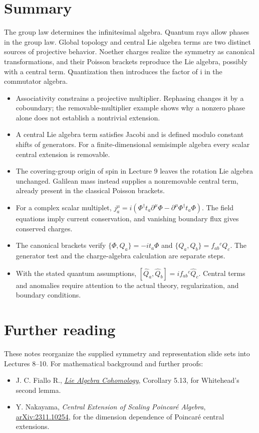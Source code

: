 \documentclass[11pt]{article}
\begin{document}
\section*{Summary}
\begin{keyidea}
The group law determines the infinitesimal algebra. Quantum rays allow
phases in the group law. Global topology and central Lie algebra terms
are two distinct sources of projective behavior. Noether charges realize
the symmetry as canonical transformations, and their Poisson brackets
reproduce the Lie algebra, possibly with a central term. Quantization
then introduces the factor of i in the commutator algebra.
\end{keyidea}
\begin{itemize}
\item Associativity constrains a projective multiplier. Rephasing changes
it by a coboundary; the removable-multiplier example shows why a nonzero
phase alone does not establish a nontrivial extension.
\item A central Lie algebra term satisfies Jacobi and is defined modulo
constant shifts of generators. For a finite-dimensional semisimple
algebra every scalar central extension is removable.
\item The covering-group origin of spin in Lecture 9 leaves the rotation
Lie algebra unchanged. Galilean mass instead supplies a nonremovable
central term, already present in the classical Poisson brackets.
\item For a complex scalar multiplet,
\(j_a^\mu=i(\Phi^\dagger t_a\partial^\mu\Phi
-\partial^\mu\Phi^\dagger t_a\Phi)\). The field equations imply
current conservation, and vanishing boundary flux gives conserved charges.
\item The canonical brackets verify \(\{\Phi,Q_a\}=-it_a\Phi\)
and \(\{Q_a,Q_b\}=f_{ab}{}^cQ_c\). The generator test and the
charge-algebra calculation are separate steps.
\item With the stated quantum assumptions,
\([\widehat Q_a,\widehat Q_b]=if_{ab}{}^c\widehat Q_c\).
Central terms and anomalies require attention to the actual theory,
regularization, and boundary conditions.
\end{itemize}

\section*{Further reading}
These notes reorganize the supplied symmetry and representation slide
sets into Lectures 8--10. For mathematical background and further proofs:
\begin{itemize}
\item J. C. Fiallo R., \href{https://www.math.ubc.ca/~reichst/Lie-Algebra-Cohomology.pdf}{\emph{Lie Algebra Cohomology}},
Corollary 5.13, for Whitehead's second lemma.
\item Y. Nakayama, \emph{Central Extension of Scaling Poincar\'e Algebra},
\href{https://arxiv.org/abs/2311.10254}{arXiv:2311.10254},
for the dimension dependence of Poincar\'e central extensions.
\end{itemize}
\end{document}
